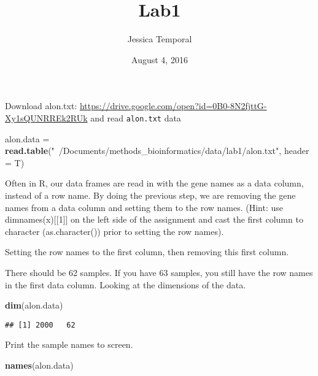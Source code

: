 \documentclass[]{article}
\title{Lab1}
\author{Jessica Temporal}
\date{August 4, 2016}
\newenvironment{Shaded}{\begin{snugshade}}{\end{snugshade}}
\newcommand{\KeywordTok}[1]{\textcolor[rgb]{0.13,0.29,0.53}{\textbf{{#1}}}}
\newcommand{\DataTypeTok}[1]{\textcolor[rgb]{0.13,0.29,0.53}{{#1}}}
\newcommand{\DecValTok}[1]{\textcolor[rgb]{0.00,0.00,0.81}{{#1}}}
\newcommand{\StringTok}[1]{\textcolor[rgb]{0.31,0.60,0.02}{{#1}}}
\newcommand{\OtherTok}[1]{\textcolor[rgb]{0.56,0.35,0.01}{{#1}}}
\newcommand{\NormalTok}[1]{{#1}}
\begin{document}
\maketitle

Download alon.txt:
\url{https://drive.google.com/open?id=0B0-8N2fjttG-Xy1sQUNRREk2RUk} and
read \texttt{alon.txt} data

\begin{Shaded}
\begin{Highlighting}[]
\NormalTok{alon.data =}\StringTok{ }\KeywordTok{read.table}\NormalTok{(}\StringTok{"~/Documents/methods_bioinformatics/data/lab1/alon.txt"}\NormalTok{,}
                       \DataTypeTok{header =} \NormalTok{T)}
\end{Highlighting}
\end{Shaded}

Often in R, our data frames are read in with the gene names as a data
column, instead of a row name. By doing the previous step, we are
removing the gene names from a data column and setting them to the row
names. (Hint: use dimnames(x){[}{[}1{]}{]} on the left side of the
assignment and cast the first column to character (as.character()) prior
to setting the row names).

Setting the row names to the first column, then removing this first
column.

\begin{Shaded}
\end{Shaded}

There should be 62 samples. If you have 63 samples, you still have the
row names in the first data column. Looking at the dimensions of the
data.

\begin{Shaded}
\begin{Highlighting}[]
\KeywordTok{dim}\NormalTok{(alon.data)}
\end{Highlighting}
\end{Shaded}

\begin{verbatim}
## [1] 2000   62
\end{verbatim}

Print the sample names to screen.

\begin{Shaded}
\begin{Highlighting}[]
\KeywordTok{names}\NormalTok{(alon.data)}
\end{Highlighting}
\end{Shaded}
\end{document}
